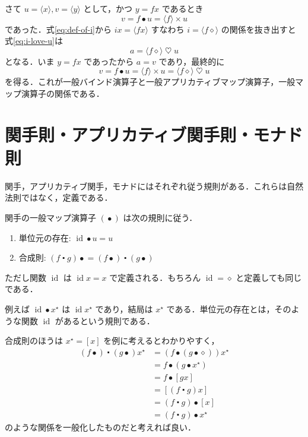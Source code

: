 \documentclass[a4paper,twocolumn]{jsbook}
\newcommand{\mAnonParam}{\diamond}
\DeclareMathOperator{\mId}{id}
\DeclareMathOperator{\mAppMap}{\times}
\DeclareMathOperator{\mBind}{\heartsuit}
\DeclareMathOperator{\mComp}{\centerdot}
\DeclareMathOperator{\mMap}{\bullet}
\newcommand{\mListWith}[1]{\left[#1\right]}
\newcommand{\mPureWith}[1]{\langle#1\rangle}
\newcommand{\mList}[1]{{#1}^\mathrm{\star}}
\begin{document}
さて $u=\mPureWith{x},v=\mPureWith{y}$ として，かつ $y=fx$ であるとき
\begin{equation}
v=f\mMap u=\mPureWith{f}\mAppMap u
\end{equation}
であった．式\eqref{eq:def-of-i}から $ix=\mPureWith{fx}$ すなわち $i=\mPureWith{f\mAnonParam}$ の関係を抜き出すと式\eqref{eq:i-love-u}は
\begin{equation}
a=\mPureWith{f\mAnonParam}\mBind u
\end{equation}
となる．いま $y=fx$ であったから $a=v$ であり，最終的に
\begin{equation}
v=f\mMap u=\mPureWith{f}\mAppMap u=\mPureWith{f\mAnonParam}\mBind u
\end{equation}
を得る．これが一般バインド演算子と一般アプリカティブマップ演算子，一般マップ演算子の関係である．


\section{関手則・アプリカティブ関手則・モナド則}

関手，アプリカティブ関手，モナドにはそれぞれ従う規則がある．これらは自然法則ではなく，定義である．

関手の一般マップ演算子 $(\mMap)$ は次の規則に従う．
\begin{enumerate}
\item 単位元の存在: $\mId\mMap u=u$
\item 合成則: $(f\mComp g)\mMap=(f\mMap)\mComp{}(g\mMap)$%
\end{enumerate}
ただし関数 $\mId$ は $\mId x=x$ で定義される．もちろん $\mId=\mAnonParam$ と定義しても同じである．

例えば $\mId\mMap\mList{x}$ は $\mId\mList{x}$ であり，結局は $\mList{x}$ である．単位元の存在とは，そのような関数 $\mId$ があるという規則である．

合成則のほうは $\mList{x}=\mListWith{x}$ を例に考えるとわかりやすく，
\begin{align}
(f\mMap)\mComp(g\mMap)\mList{x}
&=(f\mMap{}(g\mMap\mAnonParam))\mList{x}\\
&=f\mMap{}(g\mMap\mList{x})\\
&=f\mMap{}\mListWith{gx}\\
&=\mListWith{(f\mComp g)x}\\
&=(f\mComp g)\mMap{}\mListWith{x}\\
&=(f\mComp g)\mMap\mList{x}
\end{align}
のような関係を一般化したものだと考えれば良い．
\end{document}
